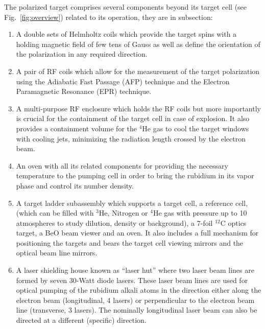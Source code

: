 The polarized target comprises several
components beyond its target cell (see Fig.~\ref{fig:overview})
related to its operation, they are in subsection:

\begin{enumerate}

\item 
A double sets of Helmholtz coils which  provide the target spins with a
holding magnetic field 
of few tens of Gauss as well as define the orientation of the
polarization in any required 
direction. 

\item
A pair of RF coils which allow for the measurement of the target
polarization
using the Adiabatic Fast Passage (AFP) technique and the Electron
Paramagnetic 
Resonance (EPR) technique.

\item
A multi-purpose RF enclosure which holds the RF coils but more
importantly is crucial for the
containment of the target cell in case of explosion. It also provides a
containment volume for the
$^4$He gas to cool the target windows with cooling jets, minimizing the
radiation length crossed  by the electron beam. 

\item 
An oven with all its related components for providing the necessary
temperature to the  pumping cell in order to bring the  rubidium in its
vapor phase 
and control its number density. 

\item 
A target ladder subassembly which supports a target cell,  a reference
cell, (which can be filled with $^3$He, Nitrogen or $^4$He gas with pressure
up to 10 atmospheres to study dilution, density or background),
 a 7-foil $^{12}$C optics target, a
BeO beam viewer and an oven. It also includes a full mechanism
for positioning the targets 
and bears the target cell viewing mirrors and the optical beam line
mirrors. 

\item 
A laser shielding house known as ``laser hut'' where two laser beam lines
are formed by seven 30-Watt diode lasers. 
These laser beam lines are used for optical
pumping of the rubidium alkali atoms in the direction either along the 
electron beam (longitudinal, 4 lasers) or perpendicular to the electron
beam line (transverse, 3 lasers). The nominally longitudinal laser beam 
can also be directed at a different (specific) direction. 
\end{enumerate} 


